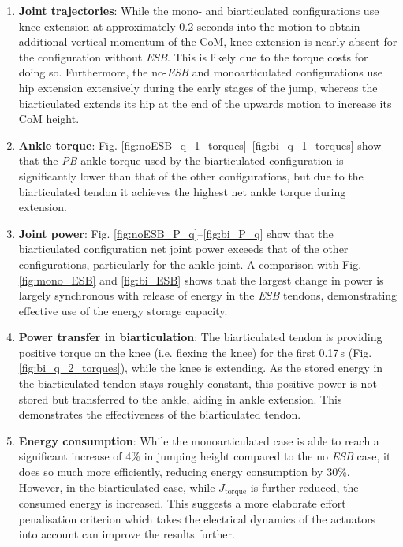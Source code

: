 \documentclass[letterpaper, 10 pt, conference]{ieeeconf}  %
\begin{document}
\begin{enumerate}
	\item \textbf{Joint trajectories}: While the mono- and biarticulated configurations use knee extension at approximately 0.2 seconds into the motion to obtain additional vertical momentum of the CoM, knee extension is nearly absent for the configuration without \textit{ESB}. This is likely due to the torque costs for doing so. Furthermore, the no-\textit{ESB} and monoarticulated configurations use hip extension extensively during the early stages of the jump, whereas the biarticulated extends its hip at the end of the upwards motion to increase its CoM height.

	\item \textbf{Ankle torque}: Fig. \ref{fig:noESB_q_1_torques}--\ref{fig:bi_q_1_torques} show that the \textit{PB} ankle torque used by the biarticulated configuration is significantly lower than that of the other configurations, but due to the biarticulated tendon it achieves the highest net ankle torque during extension.
	
	\item \textbf{Joint power}: Fig. \ref{fig:noESB_P_q}--\ref{fig:bi_P_q} show that the biarticulated configuration net joint power exceeds that of the other configurations, particularly for the ankle joint. A comparison with Fig. \ref{fig:mono_ESB} and \ref{fig:bi_ESB} shows that the largest change in power is largely synchronous with release of energy in the \textit{ESB} tendons, demonstrating effective use of the energy storage capacity.
	
	\item \textbf{Power transfer in biarticulation}: The biarticulated tendon is providing positive torque on the knee (i.e. flexing the knee) for the first 0.17\,s (Fig. \ref{fig:bi_q_2_torques}), while the knee is extending. As the stored energy in the biarticulated tendon stays roughly constant, this positive power is not stored but transferred to the ankle, aiding in ankle extension. This demonstrates the effectiveness of the biarticulated tendon.
	
	\item \textbf{Energy consumption}: While the monoarticulated case is able to reach a significant increase of 4\% in jumping height compared to the no \textit{ESB} case, it does so much more efficiently, reducing energy consumption by 30\%. However, in the biarticulated case, while $J_{\text{torque}}$ is further reduced, the consumed energy is increased. This suggests a more elaborate effort penalisation criterion which takes the electrical dynamics of the actuators into account can improve the results further.
\end{enumerate}
\end{document}
